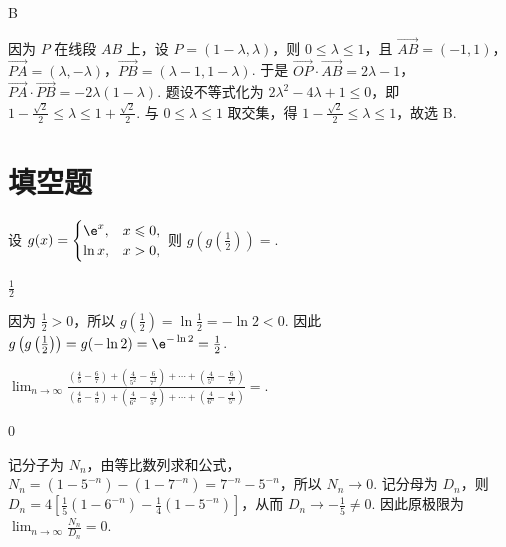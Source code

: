 \begin{answer}
B
\end{answer}

\begin{solution}
因为 \(P\) 在线段 \(AB\) 上，设 \(P=(1-\lambda,\lambda)\)，则 \(0\leqslant\lambda\leqslant1\)，且 \(\overrightarrow{AB}=(-1,1)\)，\(\overrightarrow{PA}=(\lambda,-\lambda)\)，\(\overrightarrow{PB}=(\lambda-1,1-\lambda)\). 于是 \(\overrightarrow{OP}\cdot\overrightarrow{AB}=2\lambda-1\)，\(\overrightarrow{PA}\cdot\overrightarrow{PB}=-2\lambda(1-\lambda)\). 题设不等式化为 \(2\lambda^2-4\lambda+1\leqslant0\)，即 \(1-\frac{\sqrt{2}}{2}\leqslant\lambda\leqslant1+\frac{\sqrt{2}}{2}\). 与 \(0\leqslant\lambda\leqslant1\) 取交集，得 \(1-\frac{\sqrt{2}}{2}\leqslant\lambda\leqslant1\)，故选 B.
\end{solution}

\section{填空题}
\begin{problem}
设 \( g(x) = \begin{cases}
\e^x, & x \leqslant 0,\\
\ln x, & x > 0,
\end{cases} \) 则 \( g\left(g\left(\frac{1}{2}\right)\right) = \)\fillinblank{}.
\end{problem}

\begin{answer}
\(\frac{1}{2}\)
\end{answer}

\begin{solution}
因为 \(\frac12>0\)，所以 \(g\left(\frac12\right)=\ln\frac12=-\ln2<0\). 因此 \(g\left(g\left(\frac12\right)\right)=g(-\ln2)=\e^{-\ln2}=\frac12\).
\end{solution}

\begin{problem}
\(\displaystyle\lim_{n\to\infty}\frac{\left(\frac{4}{5} - \frac{6}{7}\right) + \left(\frac{4}{5^2} - \frac{6}{7^2}\right) + \cdots + \left(\frac{4}{5^n} - \frac{6}{7^n}\right)}{\left(\frac{4}{6} - \frac{4}{5}\right) + \left(\frac{4}{6^2} - \frac{4}{5^2}\right) + \cdots + \left(\frac{4}{6^n} - \frac{4}{5^n}\right)} =\)\fillinblank{}.
\end{problem}

\begin{answer}
0
\end{answer}

\begin{solution}
记分子为 \(N_n\)，由等比数列求和公式，\(N_n=(1-5^{-n})-(1-7^{-n})=7^{-n}-5^{-n}\)，所以 \(N_n\to0\). 记分母为 \(D_n\)，则 \(D_n=4\left[\frac15(1-6^{-n})-\frac14(1-5^{-n})\right]\)，从而 \(D_n\to-\frac15\neq0\). 因此原极限为 \(\displaystyle\lim_{n\to\infty}\frac{N_n}{D_n}=0\).
\end{solution}

